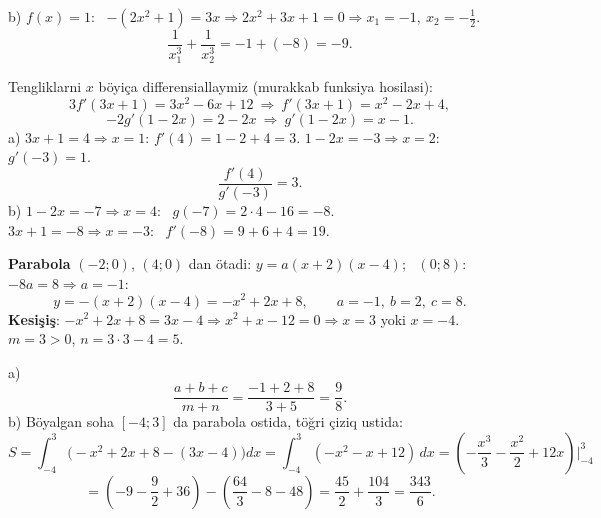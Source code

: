 b) $f(x)=1$: \ $-(2x^2+1)=3x\Rightarrow2x^2+3x+1=0\Rightarrow x_1=-1,\ x_2=-\frac12$.
\[\frac1{x_1^3}+\frac1{x_2^3}=-1+(-8)=-9.\]

\newpage
{}
Tengliklarni $x$ böyiça differensiallaymiz (murakkab funksiya hosilasi):
\[3f'(3x+1)=3x^2-6x+12\ \Rightarrow\ f'(3x+1)=x^2-2x+4,\]
\[-2g'(1-2x)=2-2x\ \Rightarrow\ g'(1-2x)=x-1.\]
a) $3x+1=4\Rightarrow x=1$: $f'(4)=1-2+4=3$. \quad $1-2x=-3\Rightarrow x=2$: $g'(-3)=1$.
\[\frac{f'(4)}{g'(-3)}=3.\]
b) $1-2x=-7\Rightarrow x=4$: \ $g(-7)=2\cdot4-16=-8$.\\
$3x+1=-8\Rightarrow x=-3$: \ $f'(-8)=9+6+4=19$.

\newpage
{}
\textbf{Parabola} $(-2;0)$, $(4;0)$ dan ötadi: $y=a(x+2)(x-4)$; \ $(0;8)$: $-8a=8\Rightarrow a=-1$:
\[y=-(x+2)(x-4)=-x^2+2x+8,\qquad a=-1,\ b=2,\ c=8.\]
\textbf{Kesişiş}: $-x^2+2x+8=3x-4\Rightarrow x^2+x-12=0\Rightarrow x=3$ yoki $x=-4$. \ $m=3>0$, $n=3\cdot3-4=5$.

a) \[\frac{a+b+c}{m+n}=\frac{-1+2+8}{3+5}=\frac98.\]
b) Böyalgan soha $[-4;3]$ da parabola ostida, töğri çiziq ustida:
\[S=\int_{-4}^{3}\bigl(-x^2+2x+8-(3x-4)\bigr)dx=\int_{-4}^{3}(-x^2-x+12)\,dx=\left(-\frac{x^3}3-\frac{x^2}2+12x\right)\Big|_{-4}^{3}\]
\[=\left(-9-\frac92+36\right)-\left(\frac{64}3-8-48\right)=\frac{45}2+\frac{104}3=\frac{343}6.\]

